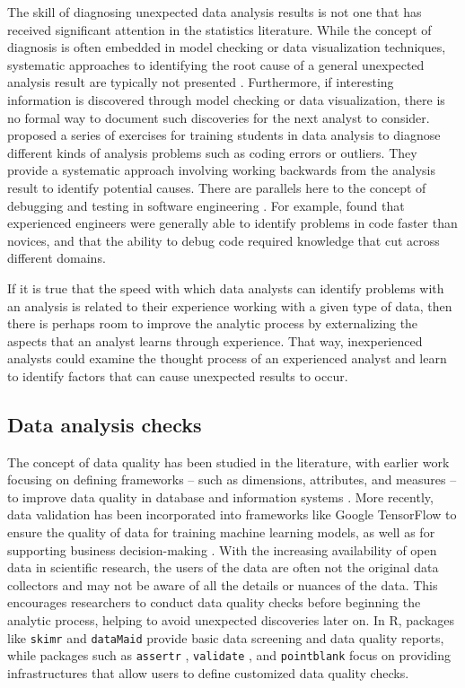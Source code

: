 \documentclass[
  12pt,
]{interact}
\begin{document}
The skill of diagnosing unexpected data analysis results is not one that
has received significant attention in the statistics literature. While
the concept of diagnosis is often embedded in model checking or data
visualization techniques, systematic approaches to identifying the root
cause of a general unexpected analysis result are typically not
presented \citep{peng2022perspective}. Furthermore, if interesting
information is discovered through model checking or data visualization,
there is no formal way to document such discoveries for the next analyst
to consider. \citet{peng_diagnosing_2021} proposed a series of exercises
for training students in data analysis to diagnose different kinds of
analysis problems such as coding errors or outliers. They provide a
systematic approach involving working backwards from the analysis result
to identify potential causes. There are parallels here to the concept of
debugging and testing in software engineering
\citep{donoghue2021teaching}. For example, \citet{li2019towards} found
that experienced engineers were generally able to identify problems in
code faster than novices, and that the ability to debug code required
knowledge that cut across different domains.

If it is true that the speed with which data analysts can identify
problems with an analysis is related to their experience working with a
given type of data, then there is perhaps room to improve the analytic
process by externalizing the aspects that an analyst learns through
experience. That way, inexperienced analysts could examine the thought
process of an experienced analyst and learn to identify factors that can
cause unexpected results to occur.

\subsection{Data analysis checks}\label{data-analysis-checks}

The concept of data quality has been studied in the literature, with
earlier work focusing on defining frameworks -- such as dimensions,
attributes, and measures -- to improve data quality in database and
information systems
\citep{wang1996beyond, batini2009methodologies, 6204995, woodall2014classification, cai2015challenges, 8642813}.
More recently, data validation has been incorporated into frameworks
like Google TensorFlow \citep{polyzotis2019data} to ensure the quality
of data for training machine learning models, as well as for supporting
business decision-making \citep{schelter2018automating}. With the
increasing availability of open data in scientific research, the users
of the data are often not the original data collectors and may not be
aware of all the details or nuances of the data. This encourages
researchers to conduct data quality checks before beginning the analytic
process, helping to avoid unexpected discoveries later on. In R,
packages like \texttt{skimr} \citep{skimr} and \texttt{dataMaid}
\citep{dataMaid} provide basic data screening and data quality reports,
while packages such as \texttt{assertr} \citep{assertr},
\texttt{validate} \citep{validate}, and \texttt{pointblank}
\citep{pointblank} focus on providing infrastructures that allow users
to define customized data quality checks.
\end{document}
